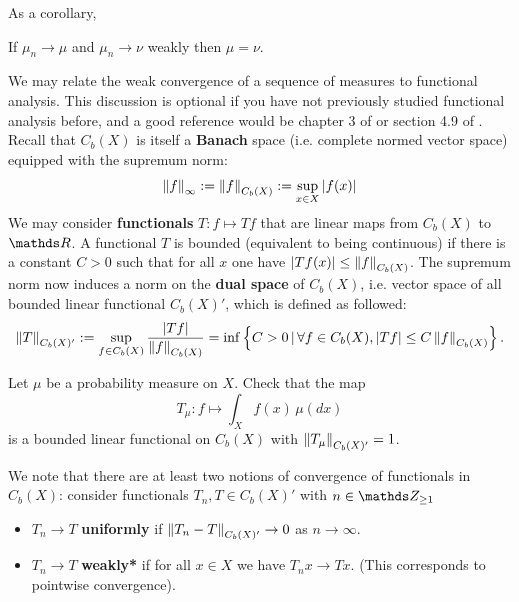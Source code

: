 As a corollary, 
\begin{corollary}
If $\mu_n \to \mu$ and $\mu_n \to \nu$ weakly then $\mu = \nu$.
\end{corollary}

\begin{unexaminable}
We may relate the weak convergence of a sequence of measures to functional analysis. This discussion is optional if you have not previously studied functional analysis before, and a good reference would be chapter 3 of \cite{BrezisFuncAnalysis} or section 4.9 of \cite{KreyszigFuncAnalysis}. Recall that $C_b(X)$ is itself a \textbf{Banach} space (i.e. complete normed vector space) equipped with the supremum norm:
\begin{equation}
    \left\| f \right\|_\infty := \left\| f \right\|_{C_b(X)} := \sup_{x \in X} |f(x)|
\end{equation}
We may consider \textbf{functionals} $T: f \mapsto Tf$ that are linear maps from $C_b(X)$ to $\R$. A functional $T$ is bounded (equivalent to being continuous) if there is a constant $C > 0$ such that for all $x$ one have $|Tf(x)| \leq \left\| f \right\|_{C_b(X)}$. The supremum norm now induces a norm on the \textbf{dual space} of $C_b(X)$, i.e. vector space of all bounded linear functional $C_b(X)'$, which is defined as followed:
\begin{equation}
    \left\| T \right\|_{C_b(X)'} := \sup_{f \in C_b(X)} \frac{|Tf|}{\left\| f \right\|_{C_b(X)}} = \inf \left\{ C>0 \,|\, \forall f \in C_b(X), |Tf| \leq C\left\| f \right\|_{C_b(X)} \right \}.
\end{equation}

\begin{exercise}
Let $\mu$ be a probability measure on $X$. Check that the map 
\begin{equation*}
    T_\mu: f \mapsto \int_X f(x) \, \mu(dx)
\end{equation*}
is a bounded linear functional on $C_b(X)$ with $\left\| T_\mu \right\|_{C_b(X)'} = 1$.
\end{exercise}

We note that there are at least two notions of convergence of functionals in $C_b(X)$: consider functionals $T_n, T \in C_b(X)'$ with $n \in \Z_{\geq 1}$
\begin{itemize}
    \item $T_n \to T$ \textbf{uniformly} if $\left\| T_n - T \right\|_{C_b(X)'} \to 0$ as $n \to \infty$.
    \item $T_n \to T$ \textbf{weakly*} if for all $x \in X$ we have $T_n x \to Tx$. (This corresponds to pointwise convergence).
\end{itemize}


\end{unexaminable}

